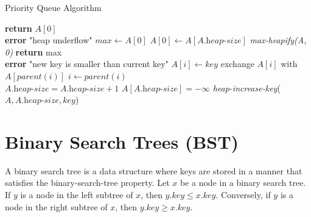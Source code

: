 \documentclass[a4paper,10pt]{article}
\newcommand{\hlt}[1]{\colorbox{color3}{#1}}
\begin{document}
\begin{algorithm}
    \caption{Priority Queue Algorithm}
    \begin{algorithmic}[1]
            \State \textbf{return} $A[0]$
        \EndFunction\\
        
         \Comment{\hlt{$O(\lg(n))$}}
                \State \textbf{error} "heap underflow"
            \EndIf
            \State $max \gets A[0]$ 
            \State $A[0] \gets A[A.\textit{heap-size}]$
            \State \textit{max-heapify(A, 0)} 
            \State \textbf{return} max
        \EndFunction\\

                \textbf{error} "new key is smaller than current key"
            \EndIf
            $A[i] \gets key$
             
                \State exchange $A[i]$ with $A[parent(i)]$
                \State $i \gets parent(i)$
            \EndWhile
        \EndFunction\\

            \State $A.\textit{heap-size} = A.\textit{heap-size} + 1$
            \State $A[A.\textit{heap-size}] = -\infty$
            \State \textit{heap-increase-key}($A, A.\textit{heap-size}, key$)
        \EndFunction
    \end{algorithmic}
    \label{algo:priority_queue}
\end{algorithm}

\section{Binary Search Trees (BST)}

A binary search tree is a data structure where keys are stored in a manner that satisfies the \hlt{binary-search-tree property}. Let $x$ be a node in a binary search tree. If $y$ is a node in the left subtree of $x$, then $y.\textit{key} \leq x.\textit{key}$. Conversely, if $y$ is a node in the right subtree of $x$, then $y.\textit{key} \geq x.\textit{key}$.
\end{document}
